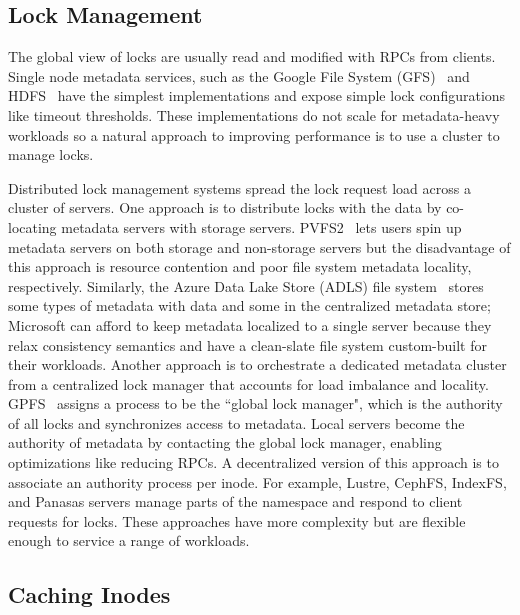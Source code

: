 \subsection{Lock Management}
\label{sec:lock-management}

The global view of locks are usually read and modified with RPCs from clients.  Single
node metadata services, such as the Google File System
(GFS)~\cite{ghemawat:sosp2003-gfs} and
HDFS~\cite{shvachko:login2012-hdfs-scalability} have the simplest
implementations and expose simple lock configurations like timeout thresholds.
These implementations do not scale for metadata-heavy workloads so a natural
approach to improving performance is to use a cluster to manage locks.

Distributed lock management systems spread the lock request load across a
cluster of servers. One approach is to distribute locks with the data by
co-locating metadata servers with storage servers.
PVFS2~\cite{devulapalli:ipdps07-pvfs2} lets users spin up metadata servers on
both storage and non-storage servers but the disadvantage of this approach is
resource contention and poor file system metadata locality, respectively.
Similarly, the Azure Data Lake Store (ADLS) file
system~\cite{ramakrishnan:sigmod17-adls} stores some types of metadata with
data and some in the centralized metadata store; Microsoft can afford to keep
metadata localized to a single server because they relax consistency semantics
and have a clean-slate file system custom-built for their workloads.  Another
approach is to orchestrate a dedicated metadata cluster from a centralized lock
manager that accounts for load imbalance and locality.
GPFS~\cite{schmuck:fast2002-gpfs} assigns a process to be the ``global lock
manager", which is the authority of all locks and synchronizes access to
metadata. Local servers become the authority of metadata by contacting the
global lock manager, enabling optimizations like reducing RPCs. A decentralized
version of this approach is to associate an authority process per inode. For
example, Lustre, CephFS, IndexFS, and Panasas servers manage parts of the
namespace and respond to client requests for locks.  These approaches have more
complexity but are flexible enough to service a range of workloads.

\subsection{Caching Inodes}
\label{sec:caching-inodes}

